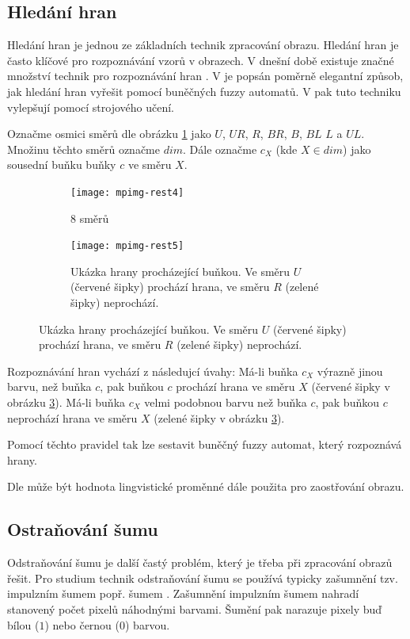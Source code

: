 \subsection{Hledání hran}
Hledání hran je jednou ze základních technik zpracování obrazu. Hledání hran je často klíčové pro rozpoznávání vzorů v obrazech. V dnešní době existuje značné množství technik pro rozpoznávání hran \cite{MaiAgg-StuComVarImDetEdTec}. V \cite{MarMeySol-HybMetGasDifModFuzCelAutImSha} je popsán poměrně elegantní způsob, jak hledání hran vyřešit pomocí buněčných fuzzy automatů. V \cite{PatMor-EdgDetTecFuzzLogCEllLeaAutFuzzImPro} pak tuto techniku vylepšují pomocí strojového učení.

Označme osmici směrů dle obrázku \ref{img:Directions:8Directions} jako $U$, $UR$, $R$, $BR$, $B$, $BL$ $L$ a $UL$. Množinu těchto směrů označme $dim$. Dále označme $c_X$ (kde $X \in dim$) jako sousední buňku buňky $c$ ve směru $X$.

\begin{figure}
   \begin{subfigure}[t]{0.4\textwidth}
      \texttt{[image: mpimg-rest4]}
      \caption{8 směrů}  \label{img:Directions:8Directions}
    \end{subfigure}%
%
    \begin{subfigure}[t]{0.4\textwidth}
      \texttt{[image: mpimg-rest5]}
      \caption{Ukázka hrany procházející buňkou. Ve směru $U$ (červené šipky) prochází hrana, ve směru $R$ (zelené šipky) neprochází.}  \label{img:Directions:Edges}
    \end{subfigure}
\end{figure}

Rozpoznávání hran vychází z následujcí úvahy: Má-li buňka $c_X$ výrazně jinou barvu, než buňka $c$, pak buňkou $c$ prochází hrana ve směru $X$ (červené šipky v obrázku \ref{img:Directions:Edges}). Má-li buňka $c_X$ velmi podobnou barvu než buňka $c$, pak buňkou $c$ neprochází hrana ve směru $X$ (zelené šipky v obrázku \ref{img:Directions:Edges}). 

Pomocí těchto pravidel tak lze sestavit buněčný fuzzy automat, který rozpoznává hrany. 

Dle \cite{MarMeySol-HybMetGasDifModFuzCelAutImSha} může být hodnota lingvistické proměnné  dále použita pro zaostřování obrazu.

\subsection{Ostraňování šumu} \label{subs:NoisRem}
Odstraňování šumu je další častý problém, který je třeba při zpracování obrazů řešit. Pro studium technik odstraňování šumu se používá typicky zašumnění tzv. impulzním šumem popř. šumem . Zašumnění impulzním šumem nahradí stanovený počet pixelů náhodnými barvami. Šumění  pak narazuje pixely buď bílou ($1$) nebo černou ($0$) barvou.

